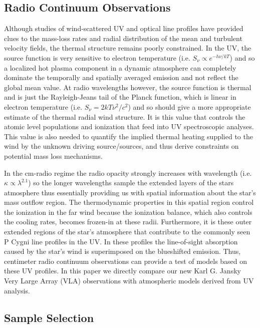\documentclass[iop]{emulateapj}
\begin{document}
\subsection{Radio Continuum Observations} \label{intro1} 

Although studies of wind-scattered UV and optical line profiles have provided clues to the mass-loss rates and radial distribution of the mean and turbulent velocity fields, the thermal structure remains poorly constrained. In the UV, the source function is very sensitive to electron temperature (i.e. $S_{\nu} \propto e^{-h\nu /kT}$) and so a localized hot plasma component in a dynamic atmosphere can completely dominate the temporally and spatially averaged emission and not reflect the global mean value. At radio wavelengths however, the source function is thermal and is just the Rayleigh-Jeans tail of the Planck function, which is linear in electron temperature (i.e. $S_{\nu} = {2kT\nu ^2 /c^2}$) and so should give a more appropriate estimate of the thermal radial wind structure. It is this value that controls the atomic level populations and ionization that feed into UV spectroscopic analyses. This value is also needed to quantify the implied thermal heating supplied to the  wind by the unknown driving source/sources, and thus derive constraints on potential mass loss mechanisms.

In the cm-radio regime the radio opacity strongly increases with wavelength (i.e. $ \kappa \propto \lambda ^{2.1}$) so the longer wavelengths sample the extended layers of the stars atmosphere thus essentially providing us with spatial information about the star's mass outflow region. The thermodynamic properties in this spatial region control the ionization in the far wind because the ionization balance, which also controls the cooling rates, becomes frozen-in at these radii. Furthermore, it is these outer extended regions of the star's atmosphere that contribute to the commonly seen P Cygni line profiles in the UV. In these profiles the line-of-sight absorption caused by the star's wind is superimposed on the blueshifted emission. Thus, centimeter radio continuum observations can provide a test of models based on these UV profiles. In this paper we directly compare our new Karl G. Jansky Very Large Array (VLA) observations with atmospheric models derived from UV analysis.

\subsection{Sample Selection} \label{intro2}
\end{document}
